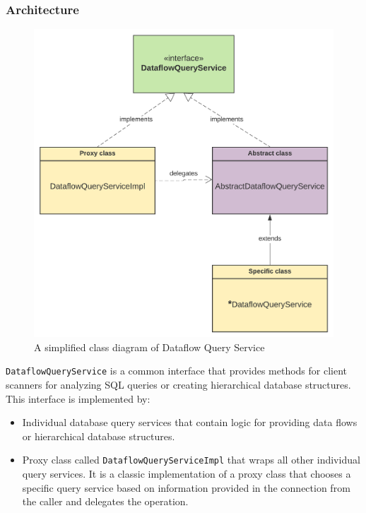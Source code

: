 \subsubsection{Architecture}
\begin{figure}[ht]\centering
\includegraphics[width=1.0\textwidth]{img/cls.png}
\caption{A simplified class diagram of Dataflow Query Service}
\label{fig01:QS}
\end{figure}  


\texttt{DataflowQueryService} is a common interface that provides methods for client scanners for analyzing SQL queries or creating hierarchical database structures. This interface is implemented by:
\begin{itemize}
    \item Individual database query services that contain logic for providing data flows or hierarchical database structures.
    \item Proxy class called \texttt{DataflowQueryServiceImpl} that wraps all other individual query services. It is a classic implementation of a proxy class that chooses a specific query service based on information provided in the connection from the caller and delegates the operation.    
\end{itemize}

